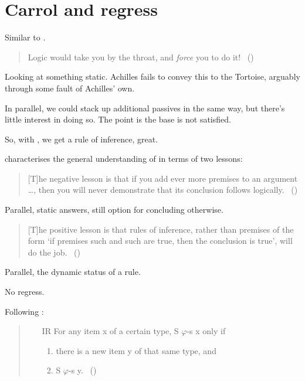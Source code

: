 \section{Carrol and regress}
\label{sec:carrol-regress}

\begin{note}
  Similar to \citeauthor{Carroll:1895uj}.
  \begin{quote}
    Logic would take you by the throat, and \emph{force} you to do it!%
    \mbox{ }\hfill\mbox{(\citeyear[280]{Carroll:1895uj})}
  \end{quote}
  Looking at something static.
  Achilles fails to convey this to the Tortoise, arguably through some fault of Achilles' own.

  In parallel, we could stack up additional passives in the same way, but there's little interest in doing so.
  The point is the base \requ{} is not satisfied.
\end{note}

\begin{note}
  So, with \citeauthor{Carroll:1895uj}, we get a rule of inference, great.

  \citeauthor{Wieland:2013vf} characterises the general understanding of \textcite{Carroll:1895uj} in terms of two lessons:
  \begin{quote}
    [T]he negative lesson is that if you add ever more premises to an argument \dots, then you will never demonstrate that its conclusion follows logically.%
    \mbox{ }\hfill\mbox{(\citeyear[984]{Wieland:2013vf})}
  \end{quote}

  Parallel, static answers, still option for concluding otherwise.

  \begin{quote}
    [T]he positive lesson is that rules of inference, rather than premises of the form `if premises such and such are true, then the conclusion is true', will do the job.%
    \mbox{ }\hfill\mbox{(\citeyear[984]{Wieland:2013vf})}
  \end{quote}

  Parallel, the dynamic status of a rule.
\end{note}

\begin{note}
  No regress.

  Following \citeauthor{Wieland:2013vf}:

  \begin{quote}
    \begin{itemize}[noitemsep]
    \item[IR]
      For any item x of a certain type, S \(\varphi\)-s x only if
      \begin{enumerate}[label=(\roman*),noitemsep]
      \item
        there is a new item y of that same type, and
      \item
        S \(\varphi\)-s y.%
        \mbox{ }\hfill\mbox{(\citeyear[996]{Wieland:2013vf})}
      \end{enumerate}
    \end{itemize}
  \end{quote}
\end{note}

